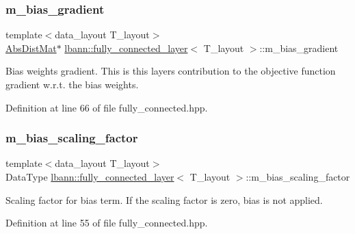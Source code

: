 \subsubsection{\texorpdfstring{m\+\_\+bias\+\_\+gradient}{m\_bias\_gradient}}
{\footnotesize\ttfamily template$<$data\+\_\+layout T\+\_\+layout$>$ \\
\hyperlink{base_8hpp_a9a697a504ae84010e7439ffec862b470}{Abs\+Dist\+Mat}$\ast$ \hyperlink{classlbann_1_1fully__connected__layer}{lbann\+::fully\+\_\+connected\+\_\+layer}$<$ T\+\_\+layout $>$\+::m\+\_\+bias\+\_\+gradient\hspace{0.3cm}{\ttfamily [private]}}

Bias weights gradient. This is this layer\textquotesingle{}s contribution to the objective function gradient w.\+r.\+t. the bias weights. 

Definition at line 66 of file fully\+\_\+connected.\+hpp.

\mbox{\label{classlbann_1_1fully__connected__layer_ae02eaffd5528bf572883f8b06d1b40c0}} 
\subsubsection{\texorpdfstring{m\+\_\+bias\+\_\+scaling\+\_\+factor}{m\_bias\_scaling\_factor}}
{\footnotesize\ttfamily template$<$data\+\_\+layout T\+\_\+layout$>$ \\
Data\+Type \hyperlink{classlbann_1_1fully__connected__layer}{lbann\+::fully\+\_\+connected\+\_\+layer}$<$ T\+\_\+layout $>$\+::m\+\_\+bias\+\_\+scaling\+\_\+factor\hspace{0.3cm}{\ttfamily [private]}}

Scaling factor for bias term. If the scaling factor is zero, bias is not applied. 

Definition at line 55 of file fully\+\_\+connected.\+hpp.

\mbox{\label{classlbann_1_1fully__connected__layer_ab80f9cb94662ce4d90aa6d8b5cfa0803}} 
